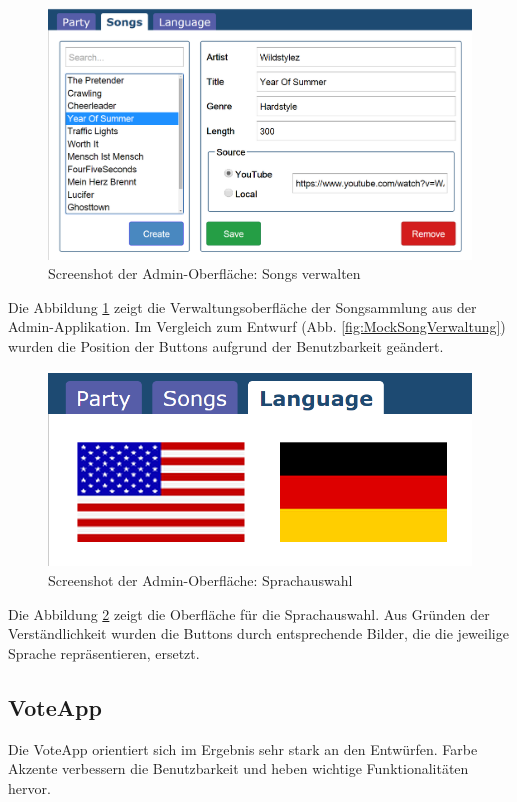 \begin{figure}[H]
\centering
\includegraphics[width=0.9\linewidth]{Bilder/Screenshot-Admin-Songs}
\caption{Screenshot der Admin-Oberfläche: Songs verwalten}
\label{fig:Screenshot-Admin-Songs}
\end{figure}

Die Abbildung \ref{fig:Screenshot-Admin-Songs} zeigt die Verwaltungsoberfläche der Songsammlung aus der Admin-Applikation. Im Vergleich zum Entwurf (Abb. \ref{fig:MockSongVerwaltung}) wurden die Position der Buttons aufgrund der Benutzbarkeit geändert.

\begin{figure}[H]
\centering
\includegraphics[width=0.5\linewidth]{Bilder/Screenshot-Admin-Language}
\caption{Screenshot der Admin-Oberfläche: Sprachauswahl}
\label{fig:Screenshot-Admin-Language}
\end{figure}

Die Abbildung \ref{fig:Screenshot-Admin-Language} zeigt die Oberfläche für die Sprachauswahl. Aus Gründen der Verständlichkeit wurden die Buttons durch entsprechende Bilder, die die jeweilige Sprache repräsentieren, ersetzt.

\subsection{VoteApp}
Die VoteApp orientiert sich im Ergebnis sehr stark an den Entwürfen. Farbe Akzente verbessern die Benutzbarkeit und heben wichtige Funktionalitäten hervor.

